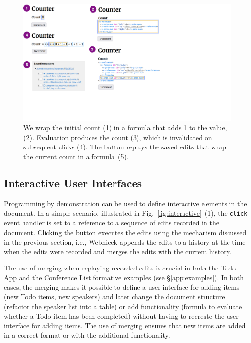 \documentclass[sigconf]{acmart}
\begin{document}

\begin{figure}[t]
\includegraphics[width=0.95\columnwidth,clip,trim=0cm 5cm 11.5cm 0cm]{fig/counter.pdf}
\caption{We wrap the initial count (1) in a formula that adds 1 to the
value, (2). Evaluation produces the count (3), which is invalidated on subsequent clicks (4).
The button replays the saved edits that wrap the current count in a formula~(5).}
\label{fig:counter}
\end{figure}


\subsection{Interactive User Interfaces}
\label{sec:impl-interaction}

Programming by demonstration can be used to define interactive elements in the document. In a
simple scenario, illustrated in Fig.~\ref{fig:interactive}~(1), the {\small\Verb_click_} event
handler is set to a reference to a sequence of edits recorded in the document. Clicking the button
executes the edits using the mechanism discussed in the previous section, i.e., Webnicek appends
the edits to a history at the time when the edits were recorded and merges the edits with the
current history.

The use of merging when replaying recorded edits is crucial in both the Todo App and the Conference
List formative examples (see \S\ref{app:examples}). In both cases, the merging makes it possible to define
a user interface for adding items (new Todo items, new speakers) and later change the document
structure (refactor the speaker list into a table) or add functionality (formula to evaluate whether a
Todo item has been completed) without having to recreate the user interface for adding items.
The use of merging ensures that new items are added in a correct format or with the additional
functionality.
\end{document}
